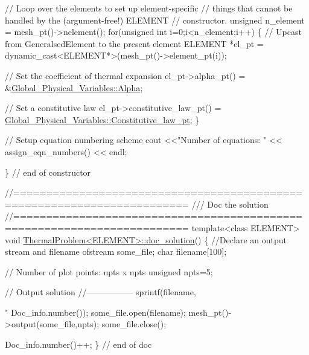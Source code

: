 \begin{DoxyCodeInclude}
 \textcolor{comment}{// Loop over the elements to set up element-specific }
 \textcolor{comment}{// things that cannot be handled by the (argument-free!) ELEMENT }
 \textcolor{comment}{// constructor.}
 \textcolor{keywordtype}{unsigned} n\_element = mesh\_pt()->nelement();
 \textcolor{keywordflow}{for}(\textcolor{keywordtype}{unsigned} \textcolor{keywordtype}{int} i=0;i<n\_element;i++)
  \{
   \textcolor{comment}{// Upcast from GeneralsedElement to the present element}
   ELEMENT *el\_pt = \textcolor{keyword}{dynamic\_cast<}ELEMENT*\textcolor{keyword}{>}(mesh\_pt()->element\_pt(i));

   \textcolor{comment}{// Set the coefficient of thermal expansion}
   el\_pt->alpha\_pt() = &\hyperlink{namespaceGlobal__Physical__Variables_aa2e802ee7cc8e1ac900ba94c3ce86eb7}{Global\_Physical\_Variables::Alpha};

   \textcolor{comment}{// Set a constitutive law}
   el\_pt->constitutive\_law\_pt() = 
    \hyperlink{namespaceGlobal__Physical__Variables_a2a37fb040c832ee7a086bb13bb02a100}{Global\_Physical\_Variables::Constitutive\_law\_pt};
  \}

 \textcolor{comment}{// Setup equation numbering scheme}
 cout <<\textcolor{stringliteral}{"Number of equations: "} << assign\_eqn\_numbers() << endl; 

\} \textcolor{comment}{// end of constructor}


\textcolor{comment}{//========================================================================}\textcolor{comment}{}
\textcolor{comment}{/// Doc the solution}
\textcolor{comment}{}\textcolor{comment}{//========================================================================}
\textcolor{keyword}{template}<\textcolor{keyword}{class} ELEMENT>
\textcolor{keywordtype}{void} \hyperlink{classThermalProblem_aa085f248542811385fefe623a9193fd8}{ThermalProblem<ELEMENT>::doc\_solution}()
\{ 
 \textcolor{comment}{//Declare an output stream and filename}
 ofstream some\_file;
 \textcolor{keywordtype}{char} filename[100];

 \textcolor{comment}{// Number of plot points: npts x npts}
 \textcolor{keywordtype}{unsigned} npts=5;

 \textcolor{comment}{// Output solution }
 \textcolor{comment}{//-----------------}
 sprintf(filename,\textcolor{stringliteral}{"%
         Doc\_info.number());
 some\_file.open(filename);
 mesh\_pt()->output(some\_file,npts);
 some\_file.close();

 Doc\_info.number()++;
\} \textcolor{comment}{// end of doc}


}
\end{DoxyCodeInclude}
